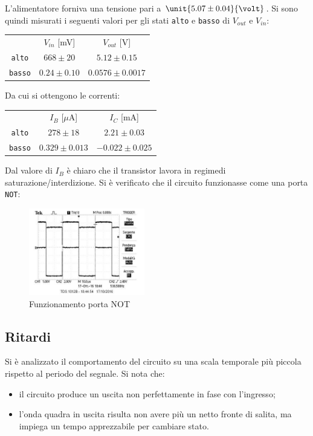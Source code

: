 \documentclass[10pt,a4paper]{article}
\def\code#1{\texttt{#1}}
\begin{document}
L'alimentatore forniva una tensione pari a $\unit{5.07 \pm 0.04}{\volt}$.
Si sono quindi misurati i seguenti valori per gli stati \code{alto} e \code{basso} di $V_{out}$ e $V_{in}$:

\begin{table}[h!]
\centering
\begin{tabular}{c|c|c}
 & $V_{in}$ [mV]& $V_{out}$ [V]\\
\code{alto} & $668 \pm 20$ & $5.12 \pm 0.15$\\
\code{basso} & $0.24 \pm 0.10$ & $0.0576 \pm 0.0017$
\end{tabular}
\end{table}

Da cui si ottengono le correnti:
\begin{table}[h!]
\centering
\begin{tabular}{c|c|c}
 & $I_B$ [$\mu$A]& $I_C$ [mA]\\
\code{alto} & $278 \pm 18$ & $2.21 \pm 0.03$\\
\code{basso} & $0.329 \pm  0.013$ & $-0.022 \pm 0.025$
\end{tabular}
\end{table}

Dal valore di $I_B$ è chiaro che il transistor lavora in regimedi saturazione/interdizione. Si è verificato che il circuito funzionasse come una porta \code{NOT}:

\begin{figure}[h!]
	\centering
	\includegraphics[width=0.45\textwidth]{../oscilloscopio/not_tarocco.jpg}
	\caption{Funzionamento porta NOT}
\end{figure}
\subsection{Ritardi}
Si è analizzato il comportamento del circuito su una scala temporale più piccola rispetto al periodo del segnale. Si nota che:
\begin{itemize}
\item il circuito produce un uscita non perfettamente in fase con l'ingresso;
\item l'onda quadra in uscita risulta non avere più un netto fronte di salita, ma impiega un tempo apprezzabile per cambiare stato.
\end{itemize}
\end{document}
